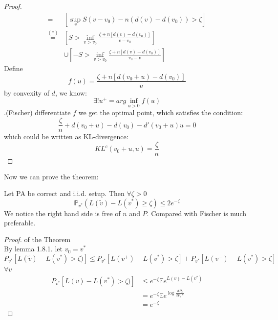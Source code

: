 \begin{proof}
\begin{align*}
	[ L(\tilde{v}) - L(v^*)>\zeta)] =& [\sup_v S(v - v_0) - n(d(v) - d(v_0)) > \zeta]\\
	\overset{(*)}{=}& [S > \inf_{v > v_0} \frac{\zeta + n[d(v) - d(v_0)]}{v - v_0}] \\
	&\cup [-S > \inf_{v > v_0} \frac{\zeta + n[d(v) - d(v_0)]}{v_0 - v}]
\end{align*}
	Define
	\begin{equation*}
		f(u) = \frac{\zeta + n[d(v_0 + u) - d(v_0)]}{u}
	\end{equation*}
	by convexity of $d$, we know:
	\begin{equation*}
		\exists! u^+ = arg\inf_{u > 0} f(u)
	\end{equation*} .(Fischer)
	differentiate $f$ we get the optimal point, which satisfies the condition:
	\begin{equation*}
		\frac{\zeta}{n} + d(v_0 + u) - d(v_0) - d'(v_0 + u)u = 0
	\end{equation*} which could be written as KL-divergence:
	\begin{equation*}
		KL^c (v_0 + u, u) = \frac{\zeta}{n}
	\end{equation*}
\end{proof}

Now we can prove the theorem:
\begin{theorem}
	Let PA be correct and i.i.d. setup. Then $\forall \zeta >0$
	\begin{equation*}
		\mathbb{P}_{v^*} (L(\tilde{v}) - L(v^*) \geq \zeta) \leq 2 e^{-\zeta}
	\end{equation*}
	We notice the right hand side is free of $n$ and $P$. Compared with Fischer is much preferable.
\end{theorem}



\begin{proof} of the Theorem\\
By lemma 1.8.1.
let $v_0 = v^*$
\begin{equation*}
	P_{v^*} [ L(\tilde{v}) - L(v^*)>\zeta)] \leq P_{v^*} [L(v^+) - L(v^*)>\zeta] + P_{v^*}[L(v^-) - L(v^*)>\zeta]
\end{equation*}
$\forall v$
\begin{align*}
	P_{v^*} [ L(v) - L(v^*)>\zeta)] &\leq e^{-\zeta} \mathbb{E} e^{L(v) - L(v^*)}\\
	&= e^{-\zeta} \mathbb{E} e^{\log \frac{dP_v}{dP_v*}}\\
	&= e^{-\zeta}
\end{align*}

	
\end{proof}

